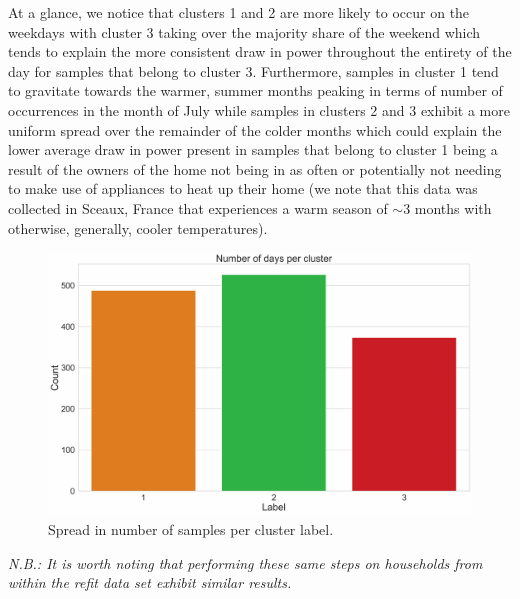 \begin{adjustwidth}{-1.65cm}{-0.0cm}
\begin{enumerate}[label=Step 2.\arabic*:, leftmargin=*]
        \noindent \newline At a glance, we notice that clusters 1 and 2 are more likely to occur on the weekdays with cluster 3 taking over the majority share of the weekend which tends to explain the more consistent draw in power throughout the entirety of the day for samples that belong to cluster 3. Furthermore, samples in cluster 1 tend to gravitate towards the warmer, summer months peaking in terms of number of occurrences in the month of July while samples in clusters 2 and 3 exhibit a more uniform spread over the remainder of the colder months which could explain the lower average draw in power present in samples that belong to cluster 1 being a result of the owners of the home not being in as often or potentially not needing to make use of appliances to heat up their home (we note that this data was collected in Sceaux, France that experiences a warm season of $\sim \! 3$  months with otherwise, generally, cooler temperatures). 
        
        \begin{figure}[hbt!]
            \centering
            \includegraphics[width=\textwidth]{Images/Chapter 5/Stage 2/UCID/UCID-HDBSCAN-5.pdf}
            \caption{Spread in number of samples per cluster label.}
            \label{fig:UCID-HDBSCAN-5}
        \end{figure}
        
        \noindent \newline \textit{N.B.: It is worth noting that performing these same steps on households from within the \gls{refit} data set exhibit similar results.}
    \end{enumerate}
\end{adjustwidth}

